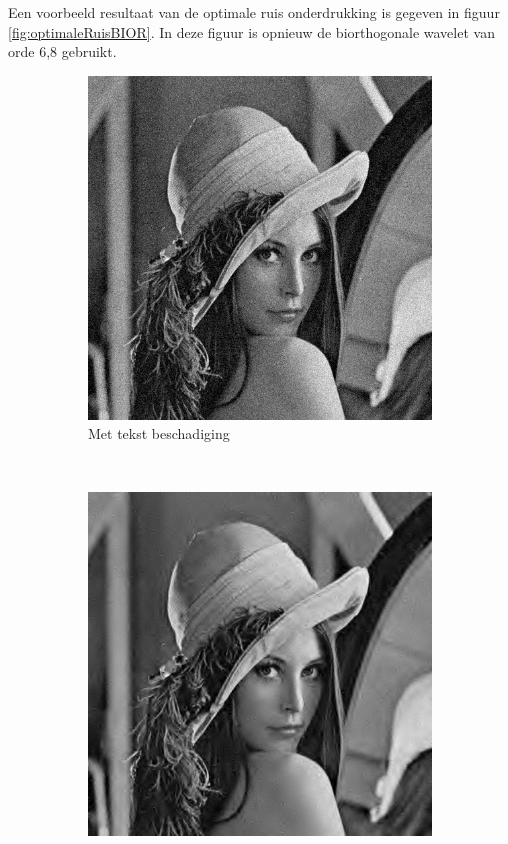 Een voorbeeld resultaat van de optimale ruis onderdrukking is gegeven in figuur \ref{fig:optimaleRuisBIOR}.
In deze figuur is opnieuw de biorthogonale wavelet van orde 6,8 gebruikt.


\begin{figure}
    \centering
    \begin{subfigure}[b]{0.45\textwidth}
        \includegraphics[width=\textwidth]{../src/denoising/image/lenaNoise_bior68.png}
        \caption{Met tekst beschadiging}
        \label{fig:tiger}
    \end{subfigure}
    ~ %
    \begin{subfigure}[b]{0.45\textwidth}
        \includegraphics[width=\textwidth]{../src/denoising/image/lenaDen_bior68.png}

\end{subfigure}
\end{figure}
